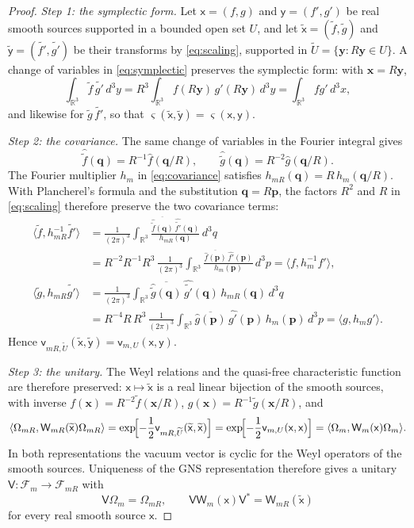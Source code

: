 \documentclass[11pt]{amsart}
\numberwithin{equation}{section}
\theoremstyle{definition}
\newcommand{\R}{\mathbb R}
\newcommand{\vv}{\mathsf v}
\newcommand{\sx}{\mathsf x}
\newcommand{\sy}{\mathsf y}
\newcommand{\bx}{\mathbf x}
\newcommand{\by}{\mathbf y}
\newcommand{\bp}{\mathbf p}
\newcommand{\ip}[2]{\langle #1,#2\rangle}
\newcommand{\wh}[1]{\widehat{#1}}
\newcommand{\wt}[1]{\widetilde{#1}}
\begin{document}
\begin{proof}
\emph{Step 1: the symplectic form.} Let \(\sx=(f,g)\) and
\(\sy=(f',g')\) be real smooth sources supported in a bounded open set
\(U\), and let \(\wt\sx=(\wt f,\wt g)\) and \(\wt\sy=(\wt{f'},\wt{g'})\)
be their transforms by \eqref{eq:scaling}, supported in
\(\wt U=\{\by:R\by\in U\}\). A change of variables in
\eqref{eq:symplectic} preserves the symplectic form: with \(\bx=R\by\),
\[
 \int_{\R^3}\wt f\,\wt{g'}\,d^3y
 =R^3\int_{\R^3}f(R\by)\,g'(R\by)\,d^3y
 =\int_{\R^3}fg'\,d^3x,
\]
and likewise for \(\wt g\,\wt{f'}\), so that
\(\varsigma(\wt\sx,\wt\sy)=\varsigma(\sx,\sy)\).

\smallskip
\emph{Step 2: the covariance.} The same change of variables in the
Fourier integral gives
\[
 \wh{\wt f}(\mathbf q)=R^{-1}\wh f(\mathbf q/R),\qquad
 \wh{\wt g}(\mathbf q)=R^{-2}\wh g(\mathbf q/R).
\]
The Fourier multiplier \(h_m\) in \eqref{eq:covariance} satisfies
\(h_{mR}(\mathbf q)=R\,h_m(\mathbf q/R)\). With
Plancherel's formula and the substitution \(\mathbf q=R\bp\), the factors
\(R^2\) and \(R\) in \eqref{eq:scaling} therefore preserve the two
covariance terms:
\begin{align*}
 \ip{\wt f}{h_{mR}^{-1}\wt{f'}}
 &=\frac1{(2\pi)^3}\int_{\R^3}
   \frac{\overline{\wh{\wt f}(\mathbf q)}\,\wh{\wt{f'}}(\mathbf q)}
        {h_{mR}(\mathbf q)}\,d^3q\\
 &=R^{-2}R^{-1}R^3\,\frac1{(2\pi)^3}\int_{\R^3}
   \frac{\overline{\wh f(\bp)}\,\wh{f'}(\bp)}{h_m(\bp)}\,d^3p
  =\ip{f}{h_m^{-1}f'},\\
 \ip{\wt g}{h_{mR}\wt{g'}}
 &=\frac1{(2\pi)^3}\int_{\R^3}
   \overline{\wh{\wt g}(\mathbf q)}\,\wh{\wt{g'}}(\mathbf q)\,
   h_{mR}(\mathbf q)\,d^3q\\
 &=R^{-4}R\,R^3\,\frac1{(2\pi)^3}\int_{\R^3}
   \overline{\wh g(\bp)}\,\wh{g'}(\bp)\,h_m(\bp)\,d^3p
  =\ip{g}{h_mg'}.
\end{align*}
Hence \(\vv_{mR,\wt U}(\wt\sx,\wt\sy)=\vv_{m,U}(\sx,\sy)\).

\smallskip
\emph{Step 3: the unitary.} The Weyl relations and the quasi-free
characteristic function are therefore preserved: \(\sx\mapsto\wt\sx\) is
a real linear bijection of the smooth sources, with inverse
\(f(\bx)=R^{-2}\wt f(\bx/R)\), \(g(\bx)=R^{-1}\wt g(\bx/R)\), and
\[
 \ip{\Omega_{mR}}{\mathsf W_{mR}(\wt\sx)\Omega_{mR}}
 =\exp\!\Bigl[-\frac12\vv_{mR,\wt U}(\wt\sx,\wt\sx)\Bigr]
 =\exp\!\Bigl[-\frac12\vv_{m,U}(\sx,\sx)\Bigr]
 =\ip{\Omega_m}{\mathsf W_m(\sx)\Omega_m}.
\]
In both representations the vacuum vector is cyclic for the Weyl
operators of the smooth sources. Uniqueness of the GNS representation
therefore gives a unitary \(\mathsf V\colon\mathscr F_m\to\mathscr F_{mR}\)
with
\[
 \mathsf V\Omega_m=\Omega_{mR},\qquad
 \mathsf V\mathsf W_m(\sx)\mathsf V^*=\mathsf W_{mR}(\wt\sx)
\]
for every real smooth source \(\sx\).


\end{proof}
\end{document}
